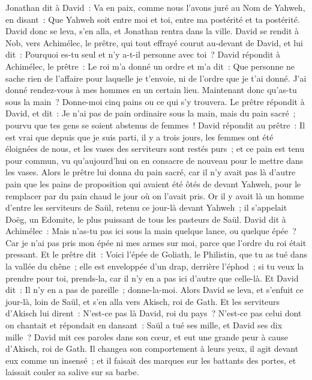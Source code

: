 \begin{multicols}{2}
Jonathan dit à David~: Va en paix, comme nous l'avons juré au Nom de Yahweh, en disant~: Que Yahweh soit entre moi et toi, entre ma postérité et ta postérité.
David donc se leva, s'en alla, et Jonathan rentra dans la ville.
\VerseOne{}David se rendit à Nob, vers Achimélec, le prêtre, qui tout effrayé courut au-devant de David, et lui dit~: Pourquoi es-tu seul et n'y a-t-il personne avec toi~?
David répondit à Achimélec, le prêtre~: Le roi m'a donné un ordre et m'a dit~: Que personne ne sache rien de l'affaire pour laquelle je t'envoie, ni de l'ordre que je t'ai donné. J'ai donné rendez-vous à mes hommes en un certain lieu.
Maintenant donc qu'as-tu sous la main~? Donne-moi cinq pains ou ce qui s'y trouvera.
Le prêtre répondit à David, et dit~: Je n'ai pas de pain ordinaire sous la main, mais du pain sacré~; pourvu que tes gens se soient abstenus de femmes~!
David répondit au prêtre~: Il est vrai que depuis que je suis parti, il y a trois jours, les femmes ont été éloignées de nous, et les vases des serviteurs sont restés purs~; et ce pain est tenu pour commun, vu qu'aujourd'hui on en consacre de nouveau pour le mettre dans les vases.
Alors le prêtre lui donna du pain sacré, car il n'y avait pas là d'autre pain que les pains de proposition qui avaient été ôtés de devant Yahweh, pour le remplacer par du pain chaud le jour où on l'avait pris.
Or il y avait là un homme d'entre les serviteurs de Saül, retenu ce jour-là devant Yahweh~; il s'appelait Doëg, un Edomite, le plus puissant de tous les pasteurs de Saül.
David dit à Achimélec~: Mais n'as-tu pas ici sous la main quelque lance, ou quelque épée~? Car je n'ai pas pris mon épée ni mes armes sur moi, parce que l'ordre du roi était pressant.
Et le prêtre dit~: Voici l'épée de Goliath, le Philistin, que tu as tué dans la vallée du chêne~; elle est enveloppée d'un drap, derrière l'éphod~; si tu veux la prendre pour toi, prends-la, car il n'y en a pas ici d'autre que celle-là. Et David dit~: Il n'y en a pas de pareille~; donne-la-moi.
Alors David se leva, et s'enfuit ce jour-là, loin de Saül, et s'en alla vers Akisch, roi de Gath.
Et les serviteurs d'Akisch lui dirent~: N'est-ce pas là David, roi du pays~? N'est-ce pas celui dont on chantait et répondait en dansant~: Saül a tué ses mille, et David ses dix mille~?
David mit ces paroles dans son cœur, et eut une grande peur à cause d'Akisch, roi de Gath.
Il changea son comportement à leurs yeux, il agit devant eux comme un insensé~; et il faisait des marques sur les battants des portes, et laissait couler sa salive sur sa barbe.

\end{multicols}

